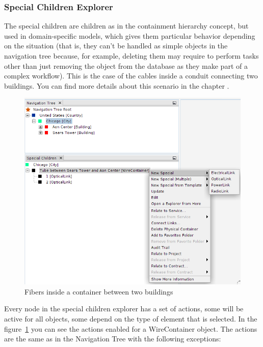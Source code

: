 \documentclass[a4paper]{article}
\begin{document}
		\subsubsection{Special Children Explorer} \label{sec:extra_explorers_children_explorer}							
		The special children are children as in the containment hierarchy concept, but used in domain-specific models, which gives them particular behavior depending on the situation (that is, they can't be handled as simple objects in the navigation tree because, for example, deleting them may require to perform tasks other than just removing the object from the database as they make part of a complex workflow). This is the case of the cables inside a conduit connecting two buildings. You can find more details about this scenario in the chapter \textbf{}.
						
		\begin{figure}[h!]
			\centering
			\includegraphics[width=0.7\linewidth]{img/navigation_tree_special_children_explorer.png}
			\caption{Fibers inside a container between two buildings}
			\label{fig:navigation_tree_special_children_explorer}
		\end{figure}
		
		Every node in the special children explorer has a set of actions, some will be active for all objects, some depend on the type of element that is selected. In the figure~\ref{fig:navigation_tree_special_children_explorer} you can see the actions enabled for a WireContainer object. The actions are the same as in the Navigation Tree with the following exceptions:
		
\end{document}
